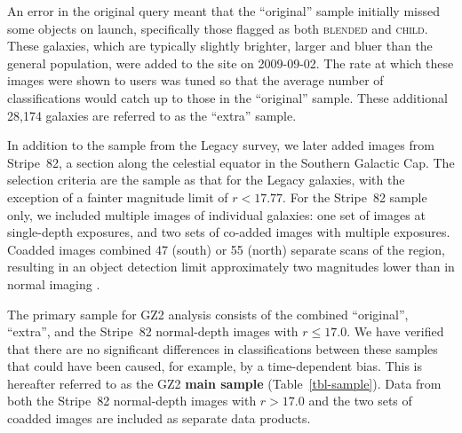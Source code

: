 \documentclass[useAMS,usenatbib]{mn2e}
\begin{document}
An error in the original query meant that the ``original'' sample initially missed some objects on launch, specifically those flagged as both \textsc{blended} and \textsc{child}. These galaxies, which are typically slightly brighter, larger and bluer than the general population, were added to the site on 2009-09-02. The rate at which these images were shown to users was tuned so that the average number of classifications would catch up to those in the ``original'' sample. These additional 28,174 galaxies are referred to as the ``extra'' sample. 

In addition to the sample from the Legacy survey, we later added images from Stripe~82, a section along the celestial equator in the Southern Galactic Cap. The selection criteria are the sample as that for the Legacy galaxies, with the exception of a fainter magnitude limit of $r < 17.77$. For the Stripe~82 sample only, we included multiple images of individual galaxies: one set of images at single-depth exposures, and two sets of co-added images with multiple exposures. Coadded images combined 47 (south) or 55 (north) separate scans of the region, resulting in an object detection limit approximately two magnitudes lower than in normal imaging \citep{ann11}. 

The primary sample for GZ2 analysis consists of the combined ``original'', ``extra'', and the Stripe~82 normal-depth images with $r\leq17.0$. We have verified that there are no significant differences in classifications between these samples that could have been caused, for example, by a time-dependent bias. This is hereafter referred to as the GZ2 {\bf main sample} (Table~\ref{tbl-sample}). Data from both the Stripe~82 normal-depth images with $r>17.0$ and the two sets of coadded images are included as separate data products. 
\end{document}
